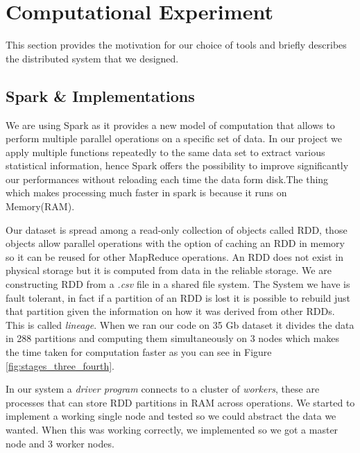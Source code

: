 \section{Computational Experiment}


This section provides the motivation for our choice of tools and briefly describes the distributed system that we designed. 

\subsection{Spark \& Implementations}
We are using Spark as it provides a new model of computation that allows to perform multiple parallel operations on a specific set of data. In our project we apply multiple functions repeatedly to the same data set to extract various statistical information, hence Spark offers the possibility to improve significantly our performances without reloading each time the data form disk\cite{Sparkzaharia}.The thing which makes processing much faster in spark is because it runs on Memory(RAM).

Our dataset is spread among a read-only collection of objects called RDD, those objects allow parallel operations with the option of caching an RDD in memory so it can be reused for other MapReduce operations. An RDD does not exist in physical storage but it is computed from data in the reliable storage. 
We are constructing RDD from a \textit{.csv} file in a shared file system. The System we have is fault tolerant, in fact if a partition of an RDD is lost it is possible to rebuild just that partition given the information on how it was derived from other RDDs. This is called \textit{lineage}\cite{Sparkzaharia}. When we ran our code on 35 Gb dataset it divides the data in 288 partitions and computing them simultaneously on 3 nodes which makes the time taken for computation faster as you can see in Figure \ref{fig:stages_three_fourth}.

In our system a \textit{driver program} connects to a cluster of \textit{workers}, these are processes that can store RDD partitions in RAM across operations\cite{RDD}.\newline
We started to implement a working single node and tested so we could abstract the data we wanted. When this was working correctly, we implemented so we got a master node and 3 worker
nodes.

